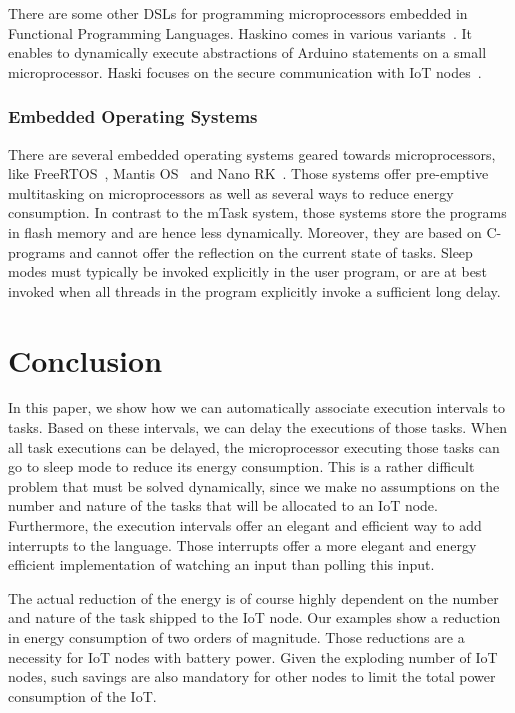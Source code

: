 \documentclass[runningheads]{llncs}
\begin{document}
There are some other DSLs for programming microprocessors embedded in Functional Programming Languages.
Haskino comes in various variants~\cite{Haskino}.
It enables to dynamically execute abstractions of Arduino statements on a small microprocessor.
Haski focuses on the secure communication with IoT nodes~\cite{Haski}.

\subsubsection{Embedded Operating Systems}

There are several embedded operating systems geared towards microprocessors, like FreeRTOS~\cite{FreeRTOS}, Mantis OS~\cite{Mantis} and Nano RK~\cite{Nano_rk}.
Those systems offer pre-emptive multitasking on microprocessors as well as several ways to reduce energy consumption.
In contrast to the mTask system, those systems store the programs in flash memory and are hence less dynamically.
Moreover, they are based on C-programs and cannot offer the reflection on the current state of tasks.
Sleep modes must typically be invoked explicitly in the user program, or are at best invoked when all threads in the program explicitly invoke a sufficient long delay.

\section{Conclusion}

In this paper, we show how we can automatically associate execution intervals to tasks.
Based on these intervals, we can delay the executions of those tasks.
When all task executions can be delayed, the microprocessor executing those tasks can go to sleep mode to reduce its energy consumption.
This is a rather difficult problem that must be solved dynamically, since we make no assumptions on the number and nature of the tasks that will be allocated to an IoT node.
Furthermore, the execution intervals offer an elegant and efficient way to add interrupts to the language.
Those interrupts offer a more elegant and energy efficient implementation of watching an input than polling this input.

The actual reduction of the energy is of course highly dependent on the number and nature of the task shipped to the IoT node.
Our examples show a reduction in energy consumption of two orders of magnitude.
Those reductions are a necessity  for IoT nodes with battery power.
Given the exploding number of IoT nodes, such savings are also mandatory for other nodes to limit the total power consumption of the IoT.
\end{document}
